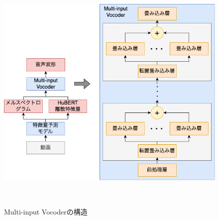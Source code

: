 \documentclass[12pt]{jarticle}
\numberwithin{equation}{section}    %
\numberwithin{figure}{section}      %
\numberwithin{table}{section}      %
\begin{document}
\begin{figure}[bt]
    \centering
    \includegraphics[height=120mm]{./figure/sec4/model/multi-input_vocoder.png}
    \caption{Multi-input Vocoderの構造}
    \label{sec4:fig:multi-input_vocoder}
\end{figure}
\end{document}
